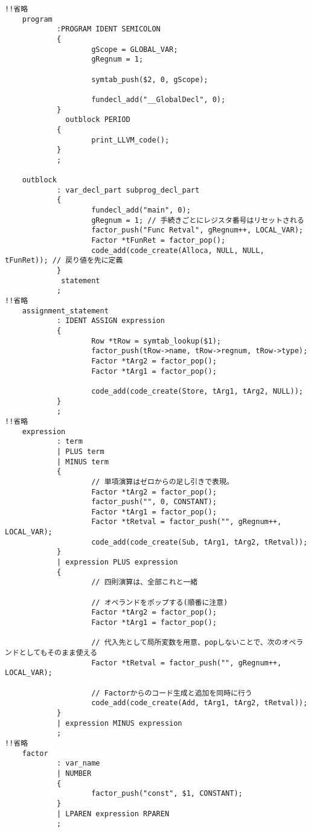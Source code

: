 \begin{lstlisting}[caption={parser.y},label={parser.y}]
!!省略
    program
            :PROGRAM IDENT SEMICOLON
            {
                    gScope = GLOBAL_VAR;
                    gRegnum = 1;
    
                    symtab_push($2, 0, gScope);
    
                    fundecl_add("__GlobalDecl", 0);
            }
              outblock PERIOD
            {
                    print_LLVM_code();
            }
            ;
    
    outblock
            : var_decl_part subprog_decl_part
            {
                    fundecl_add("main", 0);
                    gRegnum = 1; // 手続きごとにレジスタ番号はリセットされる
                    factor_push("Func Retval", gRegnum++, LOCAL_VAR);
                    Factor *tFunRet = factor_pop();
                    code_add(code_create(Alloca, NULL, NULL, tFunRet)); // 戻り値を先に定義
            }
             statement
            ;
!!省略
    assignment_statement
            : IDENT ASSIGN expression
            {
                    Row *tRow = symtab_lookup($1);
                    factor_push(tRow->name, tRow->regnum, tRow->type);
                    Factor *tArg2 = factor_pop();
                    Factor *tArg1 = factor_pop();
    
                    code_add(code_create(Store, tArg1, tArg2, NULL));
            }
            ;
!!省略
    expression
            : term
            | PLUS term
            | MINUS term
            {
                    // 単項演算はゼロからの足し引きで表現。
                    Factor *tArg2 = factor_pop();
                    factor_push("", 0, CONSTANT);
                    Factor *tArg1 = factor_pop();
                    Factor *tRetval = factor_push("", gRegnum++, LOCAL_VAR);
                    code_add(code_create(Sub, tArg1, tArg2, tRetval));
            }
            | expression PLUS expression
            {
                    // 四則演算は、全部これと一緒
    
                    // オペランドをポップする(順番に注意)
                    Factor *tArg2 = factor_pop();
                    Factor *tArg1 = factor_pop();
    
                    // 代入先として局所変数を用意、popしないことで、次のオペランドとしてもそのまま使える
                    Factor *tRetval = factor_push("", gRegnum++, LOCAL_VAR);
    
                    // Factorからのコード生成と追加を同時に行う
                    code_add(code_create(Add, tArg1, tArg2, tRetval));
            }
            | expression MINUS expression
            ;
!!省略
    factor
            : var_name
            | NUMBER
            {
                    factor_push("const", $1, CONSTANT);
            }
            | LPAREN expression RPAREN
            ;
    

\end{lstlisting}
